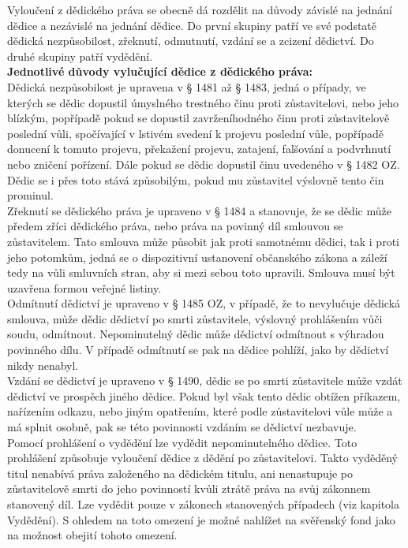 \documentclass{article}
\begin{document}
Vyloučení z dědického práva se obecně dá rozdělit na důvody závislé na jednání dědice a nezávislé na jednání dědice. Do první skupiny patří ve své podstatě dědická nezpůsobilost, zřeknutí, odmutnutí, vzdání se a zcizení dědictví. Do druhé skupiny patří vydědění. \\

\noindent\textbf{Jednotlivé důvody vylučující dědice z dědického práva:} \\

Dědická nezpůsobilost je upravena v § 1481 až § 1483, jedná o případy, ve kterých se dědic dopustil úmyslného trestného činu proti zůstavitelovi, nebo jeho blízkým, popřípadě pokud se dopustil zavrženíhodného činu proti zůstavitelově poslední vůli, spočívající v lstivém svedení k projevu poslední vůle, popřípadě donucení k tomuto projevu, překažení projevu, zatajení, falšování a podvrhnutí nebo zničení pořízení. Dále pokud se dědic dopustil činu uvedeného v § 1482 OZ. Dědic se i přes toto stává způsobilým, pokud mu zůstavitel výslovně tento čin prominul. \\

Zřeknutí se dědického práva je upraveno v § 1484 a stanovuje, že se dědic může předem zříci dědického práva, nebo práva na povinný díl smlouvou se zůstavitelem. Tato smlouva může působit jak proti samotnému dědici, tak i proti jeho potomkům, jedná se o dispozitivní ustanovení občanského zákona a záleží tedy na vůli smluvních stran, aby si mezi sebou toto upravili. Smlouva musí být uzavřena formou veřejné listiny. \\

Odmítnutí dědictví je upraveno v § 1485 OZ, v případě, že to nevylučuje dědická smlouva, může dědic dědictví po smrti zůstavitele, výslovný prohlášením vůči soudu, odmítnout. Nepominutelný dědic může dědictví odmítnout s výhradou povinného dílu. V případě odmítnutí se pak na dědice pohlíží, jako by dědictví nikdy nenabyl.\\

Vzdání se dědictví je upraveno v § 1490, dědic se po smrti zůstavitele může vzdát dědictví ve prospěch jiného dědice. Pokud byl však tento dědic obtížen příkazem, nařízením odkazu, nebo jiným opatřením, které podle zůstavitelovi vůle může a má splnit osobně, pak se této povinnosti vzdáním se dědictví nezbavuje.\\

Pomocí prohlášení o vydědění lze vydědit nepominutelného dědice. Toto prohlášení způsobuje vyloučení dědice z dědění po zůstavitelovi. Takto vyděděný titul nenabívá práva založeného na dědickém titulu, ani nenastupuje po zůstavitelově smrti do jeho povinností kvůli ztrátě práva na svůj zákonnem stanovený díl. Lze vydědit pouze v zákonech stanovených případech (viz kapitola Vydědění). S ohledem na toto omezení je možné nahlížet na svěřenský fond jako na možnost obejití tohoto omezení.\\
\end{document}

